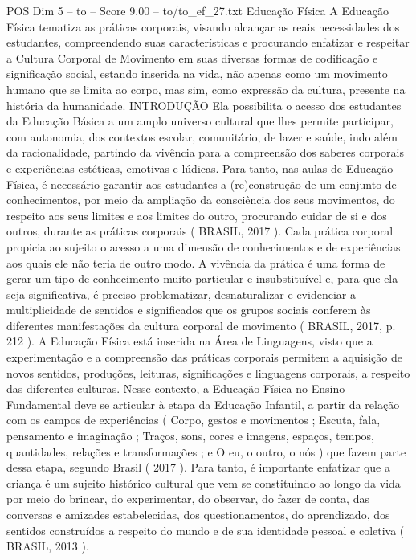 \begin{textsample}{POS Dim 5 – to – Score 9.00 – to/to\_ef\_27.txt}  \label{ex:f5_pos_030}
Educação Física A Educação Física tematiza as práticas corporais, visando alcançar as reais necessidades dos estudantes, compreendendo suas características e procurando enfatizar e respeitar a Cultura Corporal de Movimento em suas diversas formas de codificação e significação social, estando inserida na vida, não apenas como um movimento humano que se limita ao corpo, mas sim, como expressão da cultura, presente na história da humanidade.
INTRODUÇÃO Ela possibilita o acesso dos estudantes da Educação Básica a um amplo universo cultural que lhes permite participar, com autonomia, dos contextos escolar, comunitário, de lazer e saúde, indo além da racionalidade, partindo da vivência para a compreensão dos saberes corporais e experiências estéticas, emotivas e lúdicas.
Para tanto, nas aulas de Educação Física, é necessário garantir aos estudantes a (re)construção de um conjunto de conhecimentos, por meio da ampliação da consciência dos seus movimentos, do respeito aos seus limites e aos limites do outro, procurando cuidar de si e dos outros, durante as práticas corporais ( BRASIL, 2017 ).
Cada prática corporal propicia ao sujeito o acesso a uma dimensão de conhecimentos e de experiências aos quais ele não teria de outro modo.
A vivência da prática é uma forma de gerar um tipo de conhecimento muito particular e insubstituível e, para que ela seja significativa, é preciso problematizar, desnaturalizar e evidenciar a multiplicidade de sentidos e significados que os grupos sociais conferem às diferentes manifestações da cultura corporal de movimento ( BRASIL, 2017, p. 212 ).
A Educação Física está inserida na Área de Linguagens, visto que a experimentação e a compreensão das práticas corporais permitem a aquisição de novos sentidos, produções, leituras, significações e linguagens corporais, a respeito das diferentes culturas.
Nesse contexto, a Educação Física no Ensino Fundamental deve se articular à etapa da Educação Infantil, a partir da relação com os campos de experiências ( Corpo, gestos e movimentos ; Escuta, fala, pensamento e imaginação ; Traços, sons, cores e imagens, espaços, tempos, quantidades, relações e transformações ; e O eu, o outro, o nós ) que fazem parte dessa etapa, segundo Brasil ( 2017 ).
Para tanto, é importante enfatizar que a criança é um sujeito histórico cultural que vem se constituindo ao longo da vida por meio do brincar, do experimentar, do observar, do fazer de conta, das conversas e amizades estabelecidas, dos questionamentos, do aprendizado, dos sentidos construídos a respeito do mundo e de sua identidade pessoal e coletiva ( BRASIL, 2013 ).

\end{textsample}

